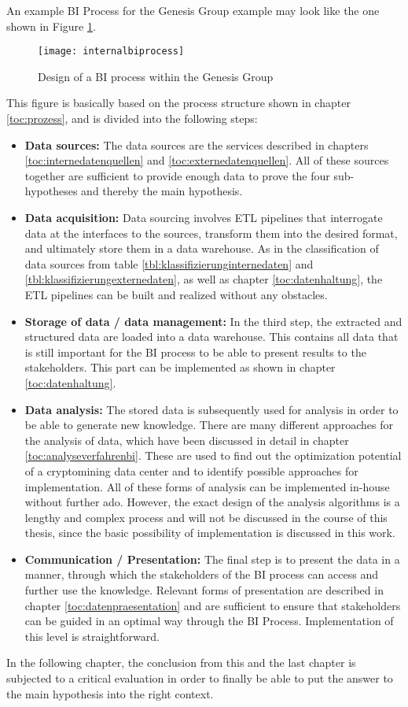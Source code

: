 An example \ac{BI} Process for the Genesis Group example may look like the one shown in Figure \ref{figure:internalbiprocess}.

\begin{figure}[H]
    \caption{Design of a BI process within the Genesis Group}
    \texttt{[image: internalbiprocess]}
    \label{figure:internalbiprocess}
\end{figure}

This figure is basically based on the process structure shown in chapter \ref{toc:prozess}, and is divided into the following
steps:
\begin{itemize}
    \item \textbf{Data sources: }The data sources are the services described in chapters \ref{toc:internedatenquellen} and \ref{toc:externedatenquellen}.
    All of these sources together are sufficient to provide enough data to prove the four sub-hypotheses and
    thereby the main hypothesis.
    \item \textbf{Data acquisition: }Data sourcing involves \ac{ETL} pipelines that interrogate data at the interfaces
    to the sources, transform them into the desired format, and ultimately store them in a data warehouse. As
    in the classification of data sources from table \ref{tbl:klassifizierunginternedaten} and \ref{tbl:klassifizierungexternedaten},
    as well as chapter \ref{toc:datenhaltung}, the \ac{ETL} pipelines can be built and realized without any obstacles.
    \item \textbf{Storage of data / data management: }In the third step, the extracted and structured data are loaded into a data warehouse.
    This contains all data that is still important for the \ac{BI} process to be able to present results to the stakeholders.
    This part can be implemented as shown in chapter \ref{toc:datenhaltung}.
    \item \textbf{Data analysis: }The stored data is subsequently used for analysis in order to be able to generate new knowledge.
    There are many different approaches for the analysis of data, which have been discussed in detail in chapter \ref{toc:analyseverfahrenbi}.
    These are used to find out the optimization potential of a cryptomining data center and to identify
    possible approaches for implementation. All of these forms of analysis can be implemented in-house
    without further ado. However, the exact design of the analysis algorithms is a lengthy and complex process
    and will not be discussed in the course of this thesis, since the basic possibility of implementation is discussed in this work.
    \item \textbf{Communication / Presentation: }The final step is to present the data in a manner, 
    through which the stakeholders of the \ac{BI} process can access and further use the knowledge.
    Relevant forms of presentation are described in
    chapter \ref{toc:datenpraesentation} and are sufficient to ensure that stakeholders can be guided in an optimal way through the
    \ac{BI} Process. Implementation of this level is straightforward.
\end{itemize}

In the following chapter, the conclusion from this and the last chapter is subjected to a critical evaluation in order to
finally be able to put the answer to the main hypothesis into the right context.